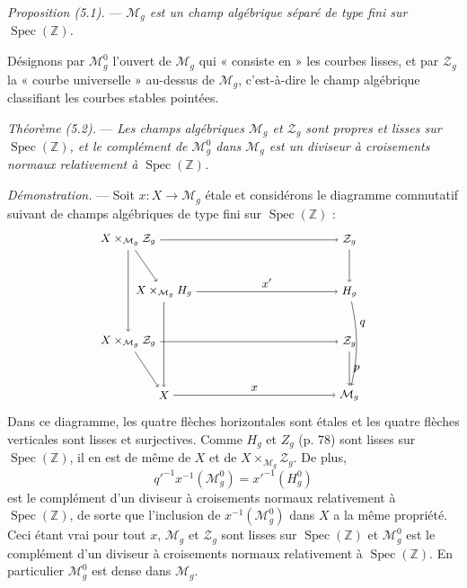 \documentclass[10pt]{article}
\newcommand{\Spec}{\operatorname{Spec}}
\begin{document}
\medskip
\noindent\emph{Proposition (5.1).} --- \emph{$\mathcal M_g$ est un champ algébrique séparé de type fini sur $\Spec(\mathbb Z)$.}

Désignons par $\mathcal M_g^0$ l'ouvert de $\mathcal M_g$ qui « consiste en » les courbes lisses, et par $\mathcal Z_g$ la « courbe universelle » au-dessus de $\mathcal M_g$, c'est-à-dire le champ algébrique classifiant les courbes stables pointées.

\medskip
\noindent\emph{Théorème (5.2).} --- \emph{Les champs algébriques $\mathcal M_g$ et $\mathcal Z_g$ sont propres et lisses sur $\Spec(\mathbb Z)$, et le complément de $\mathcal M_g^0$ dans $\mathcal M_g$ est un diviseur à croisements normaux relativement à $\Spec(\mathbb Z)$.}

\noindent\emph{Démonstration.} --- Soit $x:X\to\mathcal M_g$ étale et considérons le diagramme commutatif suivant de champs algébriques de type fini sur $\Spec(\mathbb Z)$ :
\[
\begin{tikzpicture}[baseline=(current bounding box.center), x=1cm, y=1cm, every node/.style={font=\small}]
\node (A) at (0,3.6) {$X\times_{\mathcal M_g}\mathcal Z_g$};
\node (B) at (6.2,3.6) {$\mathcal Z_g$};
\node (C) at (1.0,2.15) {$X\times_{\mathcal M_g}H_g$};
\node (D) at (6.2,2.15) {$H_g$};
\node (E) at (0,0.75) {$X\times_{\mathcal M_g}\mathcal Z_g$};
\node (F) at (6.2,0.75) {$\mathcal Z_g$};
\node (G) at (1.0,-0.75) {$X$};
\node (H) at (6.2,-0.75) {$\mathcal M_g$};
\draw[->] (A) -- (B);
\draw[->] (C) -- node[above] {$x'$} (D);
\draw[->] (E) -- (F);
\draw[->] (G) -- node[above] {$x$} (H);
\draw[->] (A) -- (E);
\draw[->] (B) -- (D);
\draw[->] (D) to[bend left=12] node[pos=0.25,right] {$q$} (H);
\draw[->] (F) -- node[right] {$p$} (H);
\draw[->] (A) -- (C);
\draw[->] (C) -- (G);
\draw[->] (E) -- (G);
\end{tikzpicture}
\]
Dans ce diagramme, les quatre flèches horizontales sont étales et les quatre flèches verticales sont lisses et surjectives. Comme $H_g$ et $Z_g$ (p. 78) sont lisses sur $\Spec(\mathbb Z)$, il en est de même de $X$ et de $X\times_{\mathcal M_g}\mathcal Z_g$. De plus,
\[
q'^{-1}x^{-1}(\mathcal M_g^0)=x'^{-1}(H_g^0)
\]
est le complément d'un diviseur à croisements normaux relativement à $\Spec(\mathbb Z)$, de sorte que l'inclusion de $x^{-1}(\mathcal M_g^0)$ dans $X$ a la même propriété. Ceci étant vrai pour tout $x$, $\mathcal M_g$ et $\mathcal Z_g$ sont lisses sur $\Spec(\mathbb Z)$ et $\mathcal M_g^0$ est le complément d'un diviseur à croisements normaux relativement à $\Spec(\mathbb Z)$. En particulier $\mathcal M_g^0$ est dense dans $\mathcal M_g$.
\end{document}
